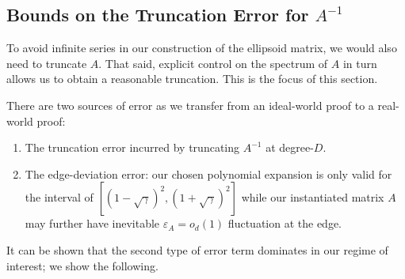 \documentclass[12pt]{article}
\newcommand{\Var}{\mathrm{Var}}
\newcommand{\calQ}{\mathcal{Q}}
\newcommand{\gam}{\gamma}
\newcommand{\q}{\mathfrak q}
\begin{document}
%

\subsection{Bounds on the Truncation Error for \texorpdfstring{$A^{-1}$}{1/A}}
To avoid infinite series in our construction of the ellipsoid matrix, we would also need to truncate $A$. That said, explicit control on the spectrum of $A$ in turn allows us to obtain a reasonable truncation. This is the focus of this section.

There are two sources of error as we transfer from an ideal-world proof to a real-world proof:\begin{enumerate}
	\item The truncation error incurred by truncating $A^{-1}$ at degree-$D$. 	\item The edge-deviation error: our chosen polynomial expansion is only valid for the interval of $[(1-\sqrt{\gam})^2, (1+\sqrt{\gam})^2] $ while our instantiated matrix $A$ may further have inevitable $\varepsilon_A= o_d(1)$ fluctuation at the edge. \end{enumerate}
It can be shown that the second type of error term dominates in our regime of interest; we show the following.
\end{document}
